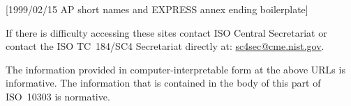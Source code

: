 [1999/02/15 AP short names and EXPRESS annex ending boilerplate]

    If there is difficulty accessing these sites contact ISO Central Secretariat or
contact the ISO TC~184/SC4 Secretariat directly at: \url{sc4sec@cme.nist.gov}.

\begin{anote}The information provided in computer-interpretable form at the above
       URLs is informative. The information that is contained in the body of this
       part of ISO~10303 is normative.
\end{anote}

\endinput
